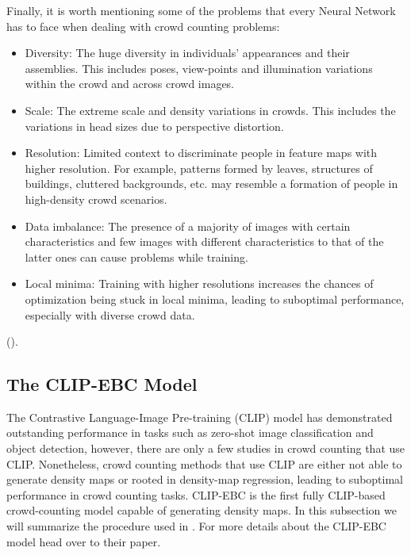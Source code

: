 Finally, it is worth mentioning some of the problems that every Neural Network has to face when dealing with crowd counting problems:
\begin{itemize}
    \item Diversity: The huge diversity in individuals' appearances and their assemblies. This includes poses, view-points and illumination variations within the crowd and across crowd images.
    \item Scale: The extreme scale and density variations in crowds. This includes the variations in head sizes due to perspective distortion.
    \item Resolution: Limited context to discriminate people in feature maps with higher resolution. For example, patterns formed by leaves, structures of buildings, cluttered backgrounds, etc. may resemble a formation of people in high-density crowd scenarios.
    \item Data imbalance: The presence of a majority of images with certain characteristics and few images with different characteristics to that of the latter ones can cause problems while training.
    \item Local minima: Training with higher resolutions increases the chances of optimization being stuck in local minima, leading to suboptimal performance, especially with diverse crowd data.
\end{itemize}
(\cite{LSC-CNN}).








\subsection{The CLIP-EBC Model}
The Contrastive Language-Image Pre-training (CLIP) model has demonstrated outstanding performance in tasks such as zero-shot image classification and object detection, however, there are only a few studies in crowd counting that use CLIP. Nonetheless, crowd counting methods that use CLIP are either not able to generate density maps or rooted in density-map regression, leading to suboptimal performance in crowd counting tasks. CLIP-EBC is the first fully CLIP-based crowd-counting model capable of generating density maps. In this subsection we will summarize the procedure used in \cite{CLIP}. For more details about the CLIP-EBC model head over to their paper.\\

